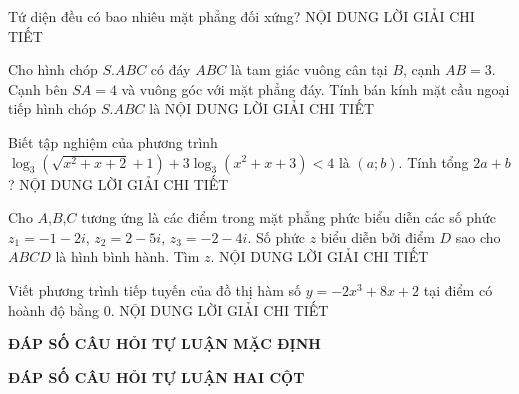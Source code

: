 \documentclass[12pt,a4paper,oneside]{article}
\begin{document}
\begin{ex}
Tứ diện đều có bao nhiêu mặt phẳng đối xứng?
\loigiai
{
NỘI DUNG LỜI GIẢI CHI TIẾT 
}
\end{ex}
\begin{ex}
Cho hình chóp $S.ABC$ có đáy $ABC$ là tam giác vuông cân tại $B$, cạnh $AB=3$. Cạnh bên $SA=4$ và vuông góc với mặt phẳng đáy. Tính bán kính mặt cầu ngoại tiếp hình chóp $S.ABC$ là
\loigiai
{
NỘI DUNG LỜI GIẢI CHI TIẾT 
}
\end{ex}
\begin{ex}
Biết tập nghiệm của phương trình $\log_3\left( \sqrt{x^2+x+2}+1 \right)+3\log_3\left( x^2+x+3 \right)<4$ là $\left( a;b \right).$ Tính tổng $2a+b$? \loigiai
{
NỘI DUNG LỜI GIẢI CHI TIẾT 
}
\end{ex}
\begin{ex}
Cho $A$,$B$,$C$ tương ứng là các điểm trong mặt phẳng phức biểu diễn các số phức $z_1=-1-2i$, $z_2=2-5i$, $z_3=-2-4i$. Số phức $z$ biểu diễn bởi điểm $D$ sao cho $ABCD$ là hình bình hành. Tìm $z$.
\loigiai
{
NỘI DUNG LỜI GIẢI CHI TIẾT 
}
\end{ex}
\begin{ex}
Viết phương trình tiếp tuyến của đồ thị hàm số $y=-2x^3+8x+2$ tại điểm có hoành độ bằng $0$.
\loigiai
{
NỘI DUNG LỜI GIẢI CHI TIẾT 
}
\end{ex}
\begin{center}
\textbf{ĐÁP SỐ CÂU HỎI TỰ LUẬN MẶC ĐỊNH}
\end{center}
\begin{flushleft}
 
\end{flushleft}
\begin{center}
\textbf{ĐÁP SỐ CÂU HỎI TỰ LUẬN HAI CỘT}
\end{center} 
\begin{flushleft}
 
\end{flushleft}
\end{document}
